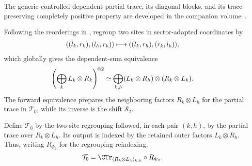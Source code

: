 The generic controlled dependent partial trace, its diagonal blocks, and its
trace-preserving completely positive property are developed in the companion
volume~\cite[``Controlled dependent partial trace'', ``Diagonal blocks of the controlled dependent partial trace'', ``The controlled dependent partial trace is trace-preserving completely positive'']{QICLean2026Blueprint}.

\begin{definition}
    \label{def:mpdo_two_site_subspin_regrouping}
    \leanok
    Following the reorderings in
    \cite[Appendix~C.2, lines~1521--1522 and~1555--1559]
    {Cirac2016MPDO_arXiv}, regroup two sites in sector-adapted coordinates by
    \begin{align}
        ((l_k,r_k),(l_h,r_h))
         & \longmapsto ((l_k,r_h),(r_k,l_h)), \notag
    \end{align}
    which globally gives the dependent-sum equivalence
    \begin{align}
        \left(\bigoplus_k L_k\otimes R_k\right)^{\!\otimes2}
         & \simeq
        \bigoplus_{k,h}(L_k\otimes R_h)\otimes(R_k\otimes L_h). \notag
    \end{align}
    The forward equivalence prepares the neighboring factors
    $R_k\otimes L_h$ for the partial trace in $\mathcal T_0$, while its inverse
    is the shift $\mathcal S_2$.
\end{definition}

\begin{definition}
    \label{def:mpdo_t0_map}
    \leanok
    Define $\mathcal T_0$ by the two-site regrouping followed, in each pair
    $(k,h)$, by the partial trace over $R_k\otimes L_h$. Its output is indexed
    by the retained outer factors $L_k\otimes R_h$. Thus, writing $R_{\Phi_2}$
    for the regrouping reindexing,
    \begin{align}
        \mathcal T_0
         & =\CTr_{(R_k\otimes L_h)_{k,h}}\circ R_{\Phi_2}.
        \label{eq:rfp_t0_factorization}
    \end{align}
\end{definition}


